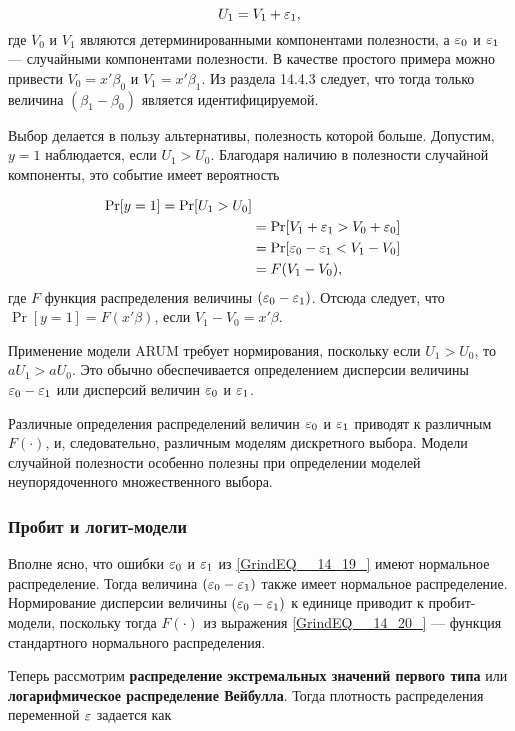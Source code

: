 \[
U_1 = V_1 + \varepsilon_1, 
\] 
где $V_0$ и $V_1$ являются детерминированными компонентами полезности,  а $\varepsilon_0$  и $\varepsilon_1$ --- случайными компонентами полезности. В качестве простого примера можно привести $V_0 = x'\beta_0$  и $V_1 = x'\beta_1$. Из раздела 14.4.3 следует, что тогда только величина $(\beta_1-\beta_0)$ является идентифицируемой.

Выбор делается в пользу альтернативы,  полезность которой больше. Допустим,  $y=1$ наблюдается,  если $U_1>U_0$. Благодаря наличию в полезности случайной компоненты,  это событие имеет вероятность  

\begin{equation}
\label{GrindEQ__14_20_} 
\begin{split}
\mathrm{Pr}[y=1] = \mathrm{Pr}[U_1 > U_0] \\
&= \mathrm{Pr}[V_1+\varepsilon_1 > V_0 + \varepsilon_0] \\
&= \mathrm{Pr}[\varepsilon_0 - \varepsilon_1 < V_1 - V_0] \\
&= F(V_1 - V_0),
\end{split}
\end{equation}
где $F$ функция распределения величины $(\varepsilon_0 - \varepsilon_1)$. Отсюда следует,  что $\Pr[y=1] = F(x'\beta)$, если $V_1 - V_0 = x'\beta$.

Применение модели ARUM требует нормирования, поскольку если $U_1 > U_0$, то $aU_1 > aU_0$. Это обычно обеспечивается определением дисперсии величины $\varepsilon_0 - \varepsilon_1$ или дисперсий величин $\varepsilon_0$ и $\varepsilon_1$.

Различные определения распределений величин $\varepsilon_0$ и $\varepsilon_1$ приводят к  различным $F(\cdot)$,  и,  следовательно,  различным моделям дискретного выбора. Модели случайной полезности особенно полезны при определении моделей неупорядоченного множественного выбора.

\subsubsection*{Пробит и логит-модели}

Вполне ясно,  что ошибки $\varepsilon_0$ и $\varepsilon_1$ из \eqref{GrindEQ__14_19_} имеют нормальное распределение. Тогда величина $(\varepsilon_0 - \varepsilon_1)$ также имеет нормальное распределение. Нормирование дисперсии величины $(\varepsilon_0 - \varepsilon_1)$ к единице приводит к пробит-модели,  поскольку тогда $F(\cdot)$ из выражения \eqref{GrindEQ__14_20_} --- функция стандартного нормального распределения.

Теперь рассмотрим \textbf{распределение экстремальных значений первого типа} или \textbf{ логарифмическое распределение Вейбулла}. Тогда плотность распределения переменной $\varepsilon$ задается как  

